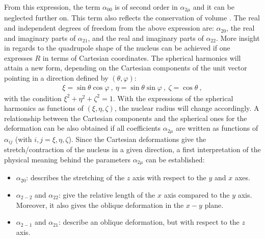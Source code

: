 From this expression, the term $\alpha_{00}$ is of second order in $\alpha_{2\mu}$ and it can be neglected further on. This term also reflects the conservation of volume \cite{greiner1996nuclear,ring2004nuclear}. The real and independent degrees of freedom from the above expression are: $\alpha_{20}$, the real and imaginary parts of $\alpha_{21}$, and the real and imaginary parts of $\alpha_{22}$. More insight in regards to the quadrupole shape of the nucleus can be achieved if one expresses $R$ in terms of Cartesian coordinates. The spherical harmonics will attain a new form, depending on the Cartesian components of the unit vector pointing in a direction defined by $(\theta,\varphi)$:
\begin{align}
    \xi=\sin\theta\cos\varphi\ ,\ \eta=\sin\theta\sin\varphi\ ,\ \zeta=\cos\theta\ ,
\end{align}
with the condition $\xi^2+\eta^2+\zeta^2=1$. With the expressions of the spherical harmonics as functions of $(\xi,\eta,\zeta)$, the nuclear radius will change accordingly. A relationship between the Cartesian components and the spherical ones for the deformation can be also obtained if all coefficients $\alpha_{2\mu}$ are written as functions of $\alpha_{ij}$ (with $i,j=\xi,\eta,\zeta$). Since the Cartesian deformations give the stretch/contraction of the nucleus in a given direction, a first interpretation of the physical meaning behind the parameters $\alpha_{2\mu}$ can be established:
\begin{itemize}
    \item $\alpha_{20}$: describes the stretching of the $z$ axis with respect to the $y$ and $x$ axes.
    \item $\alpha_{2-2}$ and $\alpha_{22}$: give the relative length of the $x$ axis compared to the $y$ axis. Moreover, it also gives the oblique deformation in the $x-y$ plane.
    \item $\alpha_{2-1}$ and $\alpha_{21}$: describe an oblique deformation, but with respect to the $z$ axis.
\end{itemize}

